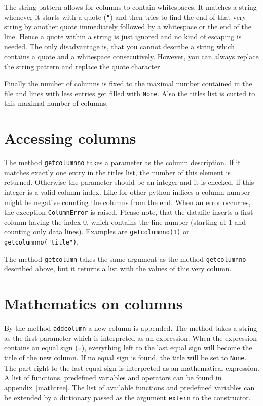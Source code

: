 The string pattern allows for columns to contain whitespaces. It
matches a string whenever it starts with a quote (\verb|"|) and then
tries to find the end of that very string by another quote immediately
followed by a whitespace or the end of the line. Hence a quote
within a string is just ignored and no kind of escaping is needed. The
only disadvantage is, that you cannot describe a string which
contains a quote and a whitespace consecutively. However, you can
always replace the string pattern and replace the quote character.

Finally the number of columns is fixed to the maximal number contained
in the file and lines with less entries get filled with \verb|None|.
Also the titles list is cutted to this maximal number of columns.

\section{Accessing columns}

The method \verb|getcolumnno| takes a parameter as the column
description. If it matches exactly one entry in the titles list, the
number of this element is returned. Otherwise the parameter should be
an integer and it is checked, if this integer is a valid column index.
Like for other python indices a column number might be negative
counting the columns from the end. When an error occurres, the
exception \verb|ColumnError| is raised. Please note, that the datafile
inserts a first column having the index 0, which contains the line
number (starting at 1 and counting only data lines). Examples are
\verb|getcolumnno(1)| or \verb|getcolumnno("title")|.

The method \verb|getcolumn| takes the same argument as the method
\verb|getcolumnno| described above, but it returns a list with the
values of this very column.

\section{Mathematics on columns}

By the method \verb|addcolumn| a new column is appended. The method
takes a string as the first parameter which is interpreted as an
expression. When the expression contains an equal sign (\verb|=|),
everything left to the last equal sign will become the title of the
new column. If no equal sign is found, the title will be set to
\verb|None|. The part right to the last equal sign is interpreted as
an mathematical expression. A list of functions, predefined variables
and operators can be found in appendix~\ref{mathtree}. The list of
available functions and predefined variables can be extended by a
dictionary passed as the argument \verb|extern| to the constructor.

